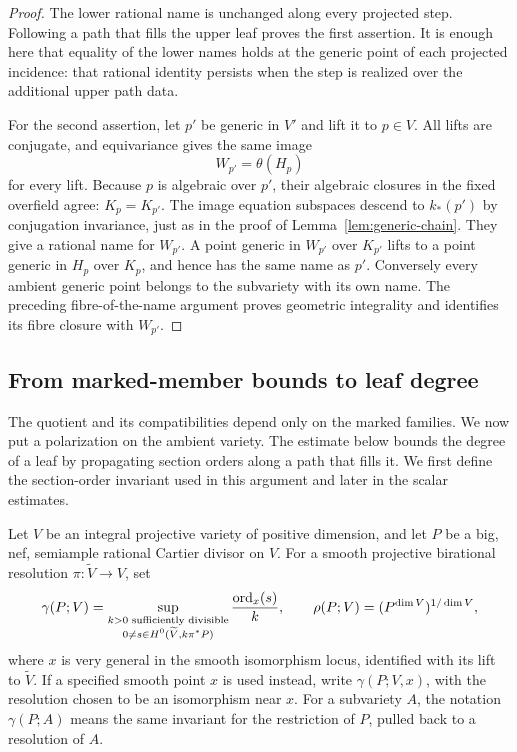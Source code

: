 \begin{proof}
The lower rational name is unchanged along every projected step.
Following a path that fills the upper leaf proves the first assertion.
It is enough here that equality of the lower names holds at the generic
point of each projected incidence: that rational identity persists when
the step is realized over the additional upper path data.

For the second assertion, let $p'$ be generic in $V'$ and lift it to
$p\in V$.  All lifts are conjugate, and equivariance gives the same
image
\[
 W_{p'}=\theta(H_p)
\]
for every lift.  Because $p$ is algebraic over $p'$, their algebraic closures in the fixed
overfield agree: $K_p=K_{p'}$. The image equation subspaces descend
to $k_*(p')$ by conjugation invariance, just as in the proof of
Lemma~\ref{lem:generic-chain}.  They give a rational name for $W_{p'}$.
A point generic in $W_{p'}$ over $K_{p'}$ lifts to a point generic in
$H_p$ over $K_p$, and hence has the same name as $p'$.  Conversely every
ambient generic point belongs to the subvariety with its own name.
The preceding fibre-of-the-name argument proves geometric integrality
and identifies its fibre closure with $W_{p'}$.
\end{proof}

\subsection{From marked-member bounds to leaf degree}

The quotient and its compatibilities depend only on the marked families.
We now put a polarization on the ambient variety. The estimate below
bounds the degree of a leaf by propagating section orders along a path
that fills it. We first define the section-order invariant used in this
argument and later in the scalar estimates.

\begin{definition}\label{def:orders}
Let $V$ be an integral projective variety of positive dimension, and let
$P$ be a big, nef, semiample rational Cartier divisor on $V$.  For a smooth
projective birational resolution $\pi:\widetilde V\to V$, set
\[
 \gamma(P;V)=
 \sup_{\substack{k>0\text{ sufficiently divisible}\\
                    0\ne s\in H^0(\widetilde V,k\pi^*P)}}
            \frac{\operatorname{ord}_x(s)}{k},
 \qquad
 \rho(P;V)=(P^{\dim V})^{1/\dim V},
\]
where $x$ is very general in the smooth isomorphism locus, identified
with its lift to $\widetilde V$.  If a specified
smooth point $x$ is used instead, write $\gamma(P;V,x)$, with the
resolution chosen to be an isomorphism near $x$.  For a subvariety $A$,
the notation $\gamma(P;A)$ means the same invariant for the restriction
of $P$, pulled back to a resolution of $A$.
\end{definition}

